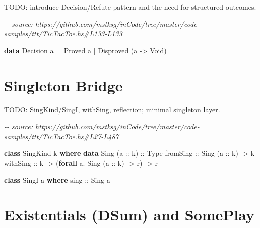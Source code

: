 \documentclass[]{article}
\newenvironment{Shaded}{}{}
\newcommand{\CommentTok}[1]{\textcolor[rgb]{0.38,0.63,0.69}{\textit{#1}}}
\newcommand{\DataTypeTok}[1]{\textcolor[rgb]{0.56,0.13,0.00}{#1}}
\newcommand{\KeywordTok}[1]{\textcolor[rgb]{0.00,0.44,0.13}{\textbf{#1}}}
\newcommand{\NormalTok}[1]{#1}
\newcommand{\OperatorTok}[1]{\textcolor[rgb]{0.40,0.40,0.40}{#1}}
\newcommand{\OtherTok}[1]{\textcolor[rgb]{0.00,0.44,0.13}{#1}}
\begin{document}
TODO: introduce Decision/Refute pattern and the need for structured outcomes.

\begin{Shaded}
\begin{Highlighting}[]
\CommentTok{{-}{-} source: https://github.com/mstksg/inCode/tree/master/code{-}samples/ttt/TicTacToe.hs\#L133{-}L133}

\KeywordTok{data} \DataTypeTok{Decision}\NormalTok{ a }\OtherTok{=} \DataTypeTok{Proved}\NormalTok{ a }\OperatorTok{|} \DataTypeTok{Disproved}\NormalTok{ (a }\OtherTok{{-}\textgreater{}} \DataTypeTok{Void}\NormalTok{)}
\end{Highlighting}
\end{Shaded}

\section{Singleton Bridge}\label{singleton-bridge}

TODO: SingKind/SingI, withSing, reflection; minimal singleton layer.

\begin{Shaded}
\begin{Highlighting}[]
\CommentTok{{-}{-} source: https://github.com/mstksg/inCode/tree/master/code{-}samples/ttt/TicTacToe.hs\#L27{-}L487}

\KeywordTok{class} \DataTypeTok{SingKind}\NormalTok{ k }\KeywordTok{where}
    \KeywordTok{data} \DataTypeTok{Sing}\NormalTok{ (}\OtherTok{a ::}\NormalTok{ k)}\OtherTok{ ::} \DataTypeTok{Type}
\OtherTok{    fromSing ::} \DataTypeTok{Sing}\NormalTok{ (}\OtherTok{a ::}\NormalTok{ k) }\OtherTok{{-}\textgreater{}}\NormalTok{ k}
\OtherTok{    withSing ::}\NormalTok{ k }\OtherTok{{-}\textgreater{}}\NormalTok{ (}\KeywordTok{forall}\NormalTok{ a}\OperatorTok{.} \DataTypeTok{Sing}\NormalTok{ (}\OtherTok{a ::}\NormalTok{ k) }\OtherTok{{-}\textgreater{}}\NormalTok{ r) }\OtherTok{{-}\textgreater{}}\NormalTok{ r}

\KeywordTok{class} \DataTypeTok{SingI}\NormalTok{ a }\KeywordTok{where}
\OtherTok{    sing ::} \DataTypeTok{Sing}\NormalTok{ a}
\end{Highlighting}
\end{Shaded}

\section{Existentials (DSum) and SomePlay}\label{existentials-dsum-and-someplay}
\end{document}
